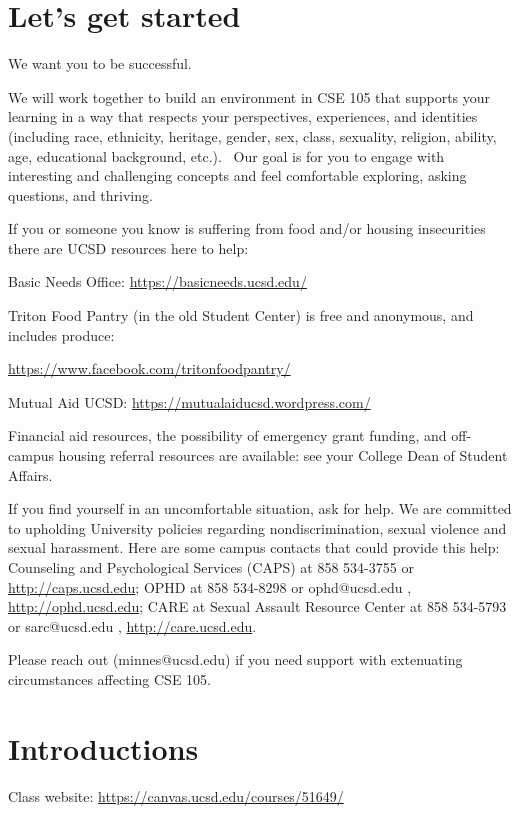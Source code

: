

\section*{Let's get started}

We want you to be successful. 

We will work together to build an 
environment in CSE 105 that supports your learning
in a way that respects your
perspectives, experiences, and identities (including race, ethnicity, heritage, gender, sex, 
class, sexuality, religion, ability, age, educational background, etc.).  
Our goal is for you to  engage
with interesting and challenging concepts and 
feel comfortable exploring, asking questions, and thriving.

If you or someone you know is suffering from food and/or housing insecurities 
there are UCSD resources here to help:

Basic Needs Office: \href{https://basicneeds.ucsd.edu/}{https://basicneeds.ucsd.edu/}

Triton Food Pantry (in the old Student Center)
is free and anonymous, and includes produce: 

\href{https://www.facebook.com/tritonfoodpantry/}{https://www.facebook.com/tritonfoodpantry/}

Mutual Aid UCSD: \href{https://mutualaiducsd.wordpress.com/}{https://mutualaiducsd.wordpress.com/}

Financial aid resources, the possibility of emergency grant funding, and off-campus housing referral 
resources are available: see your College Dean of Student Affairs.

If you find yourself in an uncomfortable situation, ask for help. 
We are committed to upholding University policies regarding nondiscrimination, sexual violence and sexual harassment.
Here are some campus contacts that could provide this help: 
Counseling and Psychological Services (CAPS) at 858 534-3755 or \href{http://caps.ucsd.edu}{http://caps.ucsd.edu}; 
OPHD at 858 534-8298 or ophd@ucsd.edu , \href{http://ophd.ucsd.edu}{http://ophd.ucsd.edu};
CARE at Sexual Assault Resource Center at 858 534-5793 or sarc@ucsd.edu , \href{http://care.ucsd.edu}{http://care.ucsd.edu}.


Please reach out (minnes@ucsd.edu) if you need support with extenuating circumstances affecting CSE 105.

\vfill

\section*{Introductions}
Class website: \href{https://canvas.ucsd.edu/courses/51649/}{https://canvas.ucsd.edu/courses/51649/}


